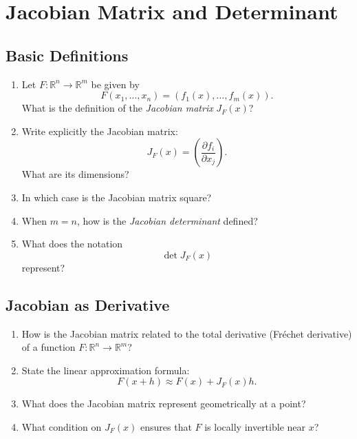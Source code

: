 \section{Jacobian Matrix and Determinant}

\subsection{Basic Definitions}

\begin{enumerate}

\item Let $F : \mathbb{R}^n \to \mathbb{R}^m$ be given by
  \[
    F(x_1,\dots,x_n) = (f_1(x),\dots,f_m(x)).
  \]
  What is the definition of the \emph{Jacobian matrix} $J_F(x)$?

\item Write explicitly the Jacobian matrix:
  \[
    J_F(x) = \left( \frac{\partial f_i}{\partial x_j} \right).
  \]
  What are its dimensions?

\item In which case is the Jacobian matrix square?

\item When $m = n$, how is the \emph{Jacobian determinant} defined?

\item What does the notation
  \[
    \det J_F(x)
  \]
  represent?

\end{enumerate}

\subsection{Jacobian as Derivative}

\begin{enumerate}

\item How is the Jacobian matrix related to the total derivative (Fréchet derivative) of a function $F : \mathbb{R}^n \to \mathbb{R}^m$?

\item State the linear approximation formula:
  \[
    F(x+h) \approx F(x) + J_F(x)h.
  \]

\item What does the Jacobian matrix represent geometrically at a point?

\item What condition on $J_F(x)$ ensures that $F$ is locally invertible near $x$?

\end{enumerate}

